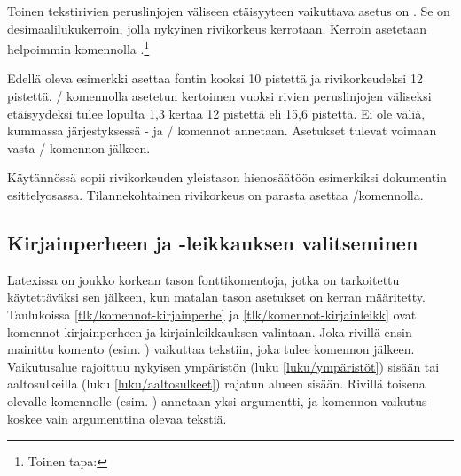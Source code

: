 Toinen tekstirivien peruslinjojen väliseen etäisyyteen vaikuttava asetus
on . Se on desimaalilukukerroin, jolla nykyinen
rivikorkeus kerrotaan. Kerroin asetetaan helpoimmin komennolla
.\footnote{Toinen tapa: }

\begin{koodilohkosis}
\fontsize{10bp}{12bp} \linespread{1.3} \selectfont
\end{koodilohkosis}

\noindent
Edellä oleva esimerkki asettaa fontin kooksi 10 pistettä ja
rivikorkeudeksi 12 pistettä. \-/ komennolla asetetun
kertoimen vuoksi rivien peruslinjojen väliseksi etäisyydeksi tulee
lopulta 1,3 kertaa 12 pistettä eli 15,6 pistettä. Ei ole väliä, kummassa
järjestyksessä - ja \-/ komennot
annetaan. Asetukset tulevat voimaan vasta \-/
komennon jälkeen.

Käytännössä  sopii rivikorkeuden yleistason
hienosäätöön esimerkiksi dokumentin esittelyosassa. Tilannekohtainen
rivikorkeus on parasta asettaa \-/komennolla.

\subsection{Kirjainperheen ja -leikkauksen valitseminen}
\label{luku/fontit-korkea}

Latexissa on joukko korkean tason fonttikomentoja, jotka on tarkoitettu
käytettäväksi sen jälkeen, kun matalan tason asetukset on kerran
määritetty. Taulukoissa \ref{tlk/komennot-kirjainperhe} ja
\ref{tlk/komennot-kirjainleikk} ovat komennot kirjainperheen ja
kirjainleikkauksen valintaan. Joka rivillä ensin mainittu komento (esim.
) vaikuttaa tekstiin, joka tulee komennon jälkeen.
Vaikutusalue rajoittuu nykyisen ympäristön (luku \ref{luku/ympäristöt})
sisään tai aaltosulkeilla (luku \ref{luku/aaltosulkeet}) rajatun alueen
sisään. Rivillä toisena olevalle komennolle (esim. )
annetaan yksi argumentti, ja komennon vaikutus koskee vain argumenttina
olevaa tekstiä.


